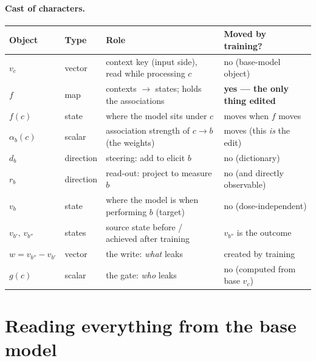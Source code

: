 \documentclass[11pt]{article}
\newcommand{\vc}{v_c}
\newcommand{\vb}{v_b}
\begin{document}
\paragraph{Cast of characters.}
\begin{center}
\small
\begin{tabular}{@{}llll@{}}
\toprule
Object & Type & Role & Moved by training? \\
\midrule
$\vc$ & vector & context key (input side), read while processing $c$ & no (base-model object) \\
$f$ & map & contexts $\to$ states; holds the associations & \textbf{yes --- the only thing edited} \\
$f(c)$ & state & where the model sits under $c$ & moves when $f$ moves \\
$\alpha_b(c)$ & scalar & association strength of $c \to b$ (the weights) & moves (this \emph{is} the edit) \\
$d_b$ & direction & steering: add to elicit $b$ & no (dictionary) \\
$r_b$ & direction & read-out: project to measure $b$ & no (and directly observable) \\
$\vb$ & state & where the model is when performing $b$ (target) & no (dose-independent) \\
$v_{b'},\, v_{b''}$ & states & source state before / achieved after training & $v_{b''}$ is the outcome \\
$w = v_{b''} - v_{b'}$ & vector & the write: \emph{what} leaks & created by training \\
$g(c)$ & scalar & the gate: \emph{who} leaks & no (computed from base $\vc$) \\
\bottomrule
\end{tabular}
\end{center}

\section{Reading everything from the base model}
\label{sec:estimating}
\end{document}
